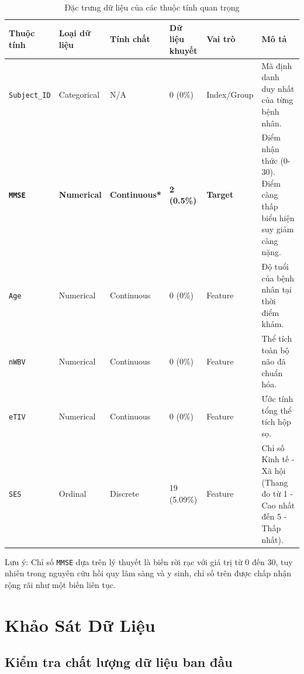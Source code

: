 \begin{table}[H]
    \centering
    \renewcommand{\arraystretch}{1.3}
    \setlength{\tabcolsep}{6pt}
    \begin{tabular}{|p{2.5cm}|p{2cm}|p{2.5cm}|p{2cm}|p{2.25cm}|p{4cm}|}
        \hline
        \rowcolor[rgb]{0.8, 0.9, 1.0}

        \textbf{Thuộc tính} & \textbf{Loại dữ liệu} & \textbf{Tính chất} & \textbf{Dữ liệu khuyết} & \textbf{Vai trò} & \textbf{Mô tả} \\ \hline

        \texttt{Subject\_ID} & Categorical & N/A & 0 (0\%) & Index/Group & Mã định danh duy nhất của từng bệnh nhân. \\ \hline

        \textbf{\texttt{MMSE}} & \textbf{Numerical} & \textbf{Continuous*} & \textbf{2 (0.5\%)} & \textbf{Target} & Điểm nhận thức (0-30). Điểm càng thấp biểu hiện suy giảm càng nặng. \\ \hline

        \texttt{Age} & Numerical & Continuous & 0 (0\%) & Feature & Độ tuổi của bệnh nhân tại thời điểm khám. \\ \hline

        \texttt{nWBV} & Numerical & Continuous & 0 (0\%) & Feature & Thể tích toàn bộ não đã chuẩn hóa. \\ \hline

        \texttt{eTIV} & Numerical & Continuous & 0 (0\%) & Feature & Ước tính tổng thể tích hộp sọ. \\ \hline
        
        \texttt{SES} & Ordinal & Discrete & 19 (5.09\%) & Feature & Chỉ số Kinh tế - Xã hội (Thang đo từ 1 - Cao nhất đến 5 - Thấp nhất). \\ \hline
    \end{tabular}
    \caption{Đặc trưng dữ liệu của các thuộc tính quan trọng}
\end{table}

Lưu ý: Chỉ số \texttt{MMSE} dựa trên lý thuyết là biến rời rạc với giá trị từ 0 đến 30, tuy nhiên trong nguyên cứu hồi quy lâm sàng và y sinh, chỉ số trên được chấp nhận rộng rãi như một biến liên tục.

\newpage

\section{Khảo Sát Dữ Liệu}

\subsection{Kiểm tra chất lượng dữ liệu ban đầu}

